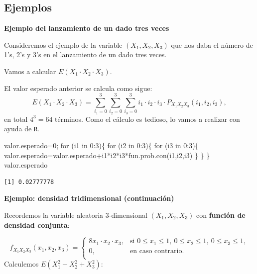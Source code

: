 \documentclass[
  letterpaper,
  DIV=11,
  numbers=noendperiod]{scrreprt}
\newenvironment{Shaded}{\begin{snugshade}}{\end{snugshade}}
\newcommand{\ControlFlowTok}[1]{\textcolor[rgb]{0.00,0.23,0.31}{#1}}
\newcommand{\DecValTok}[1]{\textcolor[rgb]{0.68,0.00,0.00}{#1}}
\newcommand{\FunctionTok}[1]{\textcolor[rgb]{0.28,0.35,0.67}{#1}}
\newcommand{\NormalTok}[1]{\textcolor[rgb]{0.00,0.23,0.31}{#1}}
\newcommand{\OtherTok}[1]{\textcolor[rgb]{0.00,0.23,0.31}{#1}}
\newcommand{\SpecialCharTok}[1]{\textcolor[rgb]{0.37,0.37,0.37}{#1}}
\begin{document}
\hypertarget{ejemplos-12}{%
\subsection{Ejemplos}\label{ejemplos-12}}

\textbf{Ejemplo del lanzamiento de un dado tres veces}

Consideremos el ejemplo de la variable \((X_1,X_2,X_3)\) que nos daba el
número de 1's, 2's y 3's en el lanzamiento de un dado tres veces.

Vamos a calcular \(E\left(X_1\cdot X_2\cdot X_3\right)\).

El valor esperado anterior se calcula como sigue: \[
E\left(X_1\cdot X_2\cdot X_3\right)\displaystyle =\sum_{i_1=0}^3\sum_{i_2=0}^3
\sum_{i_3=0}^3 i_1\cdot i_2\cdot i_3\cdot P_{X_1X_2X_3}(i_1,i_2,i_3),
\] en total \(4^3=64\) términos. Como el cálculo es tedioso, lo vamos a
realizar con ayuda de \texttt{R}.

\begin{Shaded}
\begin{Highlighting}[]
\NormalTok{valor.esperado}\OtherTok{=}\DecValTok{0}\NormalTok{;}
\ControlFlowTok{for}\NormalTok{ (i1 }\ControlFlowTok{in} \DecValTok{0}\SpecialCharTok{:}\DecValTok{3}\NormalTok{)\{}
  \ControlFlowTok{for}\NormalTok{ (i2 }\ControlFlowTok{in} \DecValTok{0}\SpecialCharTok{:}\DecValTok{3}\NormalTok{)\{}
    \ControlFlowTok{for}\NormalTok{ (i3 }\ControlFlowTok{in} \DecValTok{0}\SpecialCharTok{:}\DecValTok{3}\NormalTok{)\{}
\NormalTok{      valor.esperado}\OtherTok{=}\NormalTok{valor.esperado}\SpecialCharTok{+}\NormalTok{i1}\SpecialCharTok{*}\NormalTok{i2}\SpecialCharTok{*}\NormalTok{i3}\SpecialCharTok{*}\FunctionTok{fun.prob.con}\NormalTok{(i1,i2,i3)}
\NormalTok{    \}}
\NormalTok{  \}}
\NormalTok{\}}
\NormalTok{valor.esperado}
\end{Highlighting}
\end{Shaded}

\begin{verbatim}
[1] 0.02777778
\end{verbatim}

\textbf{Ejemplo: densidad tridimensional (continuación)}

Recordemos la variable aleatoria \(3\)-dimensional \((X_1,X_2,X_3)\) con
\textbf{función de densidad conjunta}:

\[
f_{X_1X_2X_3}(x_1,x_2,x_3)=\begin{cases}
8 x_1\cdot x_2\cdot x_3, & \mbox{si }0\leq x_1\leq 1,\ 0\leq x_2\leq 1,\ 0\leq x_3\leq 1, \\
0, & \mbox{en caso contrario.}\\
\end{cases}
\] Calculemos \(E(X_1^2+X_2^2+X_3^2)\):
\end{document}
